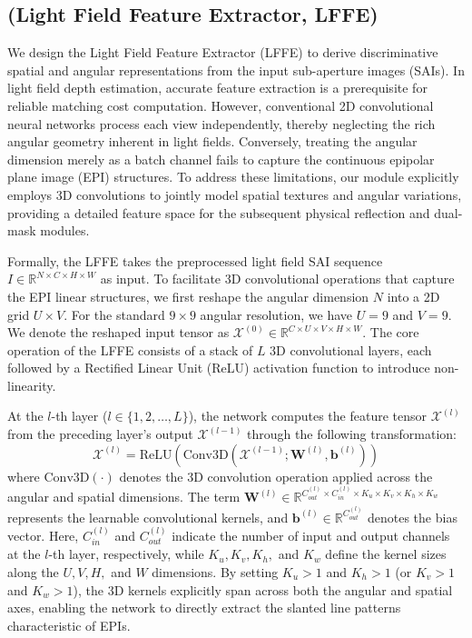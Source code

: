 \subsection{(Light Field Feature Extractor, LFFE)}

We design the Light Field Feature Extractor (LFFE) to derive discriminative spatial and angular representations from the input sub-aperture images (SAIs). In light field depth estimation, accurate feature extraction is a prerequisite for reliable matching cost computation. However, conventional 2D convolutional neural networks process each view independently, thereby neglecting the rich angular geometry inherent in light fields. Conversely, treating the angular dimension merely as a batch channel fails to capture the continuous epipolar plane image (EPI) structures. To address these limitations, our module explicitly employs 3D convolutions to jointly model spatial textures and angular variations, providing a detailed feature space for the subsequent physical reflection and dual-mask modules.

Formally, the LFFE takes the preprocessed light field SAI sequence $I \in \mathbb{R}^{N \times C \times H \times W}$ as input. To facilitate 3D convolutional operations that capture the EPI linear structures, we first reshape the angular dimension $N$ into a 2D grid $U \times V$. For the standard $9 \times 9$ angular resolution, we have $U=9$ and $V=9$. We denote the reshaped input tensor as $\mathcal{X}^{(0)} \in \mathbb{R}^{C \times U \times V \times H \times W}$. The core operation of the LFFE consists of a stack of $L$ 3D convolutional layers, each followed by a Rectified Linear Unit (ReLU) activation function to introduce non-linearity. 

At the $l$-th layer ($l \in \{1, 2, \dots, L\}$), the network computes the feature tensor $\mathcal{X}^{(l)}$ from the preceding layer's output $\mathcal{X}^{(l-1)}$ through the following transformation:
\begin{equation}
\label{eq:eq26}
\mathcal{X}^{(l)} = \text{ReLU}\left( \text{Conv3D}\left(\mathcal{X}^{(l-1)}; \mathbf{W}^{(l)}, \mathbf{b}^{(l)}\right) \right)
\end{equation}
where $\text{Conv3D}(\cdot)$ denotes the 3D convolution operation applied across the angular and spatial dimensions. The term $\mathbf{W}^{(l)} \in \mathbb{R}^{C_{out}^{(l)} \times C_{in}^{(l)} \times K_u \times K_v \times K_h \times K_w}$ represents the learnable convolutional kernels, and $\mathbf{b}^{(l)} \in \mathbb{R}^{C_{out}^{(l)}}$ denotes the bias vector. Here, $C_{in}^{(l)}$ and $C_{out}^{(l)}$ indicate the number of input and output channels at the $l$-th layer, respectively, while $K_u, K_v, K_h,$ and $K_w$ define the kernel sizes along the $U, V, H,$ and $W$ dimensions. By setting $K_u > 1$ and $K_h > 1$ (or $K_v > 1$ and $K_w > 1$), the 3D kernels explicitly span across both the angular and spatial axes, enabling the network to directly extract the slanted line patterns characteristic of EPIs.

